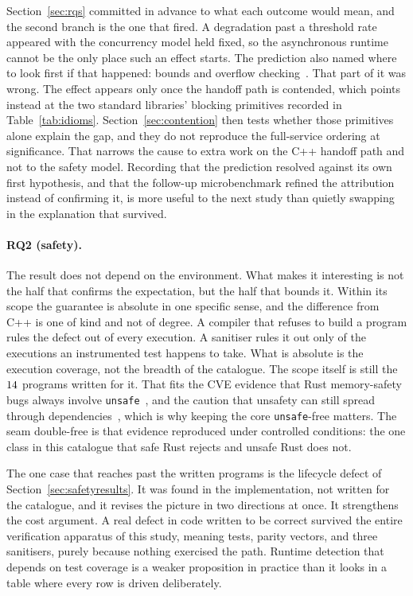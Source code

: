 \documentclass[english,oneside,a4paper,censored,csm,software-track-2020]{HYthesisML}
\begin{document}
Section~\ref{sec:rqs}
committed in advance to what each outcome would mean, and the second branch is the one that
fired. A degradation past a threshold rate appeared with the concurrency model held fixed, so the
asynchronous runtime cannot be the only place such an effect starts. The prediction also
named where to look first if that happened: bounds and overflow
checking~\cite{zhang2022runtime,harris2023morello}. That part of it was wrong. The effect
appears only once the handoff path is contended, which points instead at the two standard
libraries' blocking primitives recorded in Table~\ref{tab:idioms}. Section~\ref{sec:contention}
then tests whether those primitives alone explain the gap, and they do not reproduce the
full-service ordering at significance. That narrows the cause to extra work on the C++ handoff
path and not to the safety model. Recording that the prediction resolved against its own first
hypothesis, and that the follow-up microbenchmark refined the attribution instead of confirming it,
is more useful to the next study than quietly swapping in the explanation that survived.

\paragraph{RQ2 (safety).} The result does not depend on the environment. What makes it
interesting is not the half that confirms the expectation, but the half that bounds it. Within
its scope the guarantee is absolute in one specific sense, and the difference from C++ is one of
kind and not of degree. A compiler that refuses to build a program rules the defect out of
every execution. A sanitiser rules it out only of the executions an instrumented test
happens to take. What is absolute is the execution coverage, not the breadth of the catalogue.
The scope itself is still the $14$ programs written for it.
That fits the CVE evidence that Rust memory-safety bugs always involve
\texttt{unsafe}~\cite{xu2021rustcve}, and the caution that unsafety can still spread
through dependencies~\cite{evans2020rust}, which is why keeping the core \texttt{unsafe}-free
matters. The seam double-free is that evidence reproduced under controlled conditions: the one
class in this catalogue that safe Rust rejects and unsafe Rust does not.

The one case that reaches past the written programs is the lifecycle defect of
Section~\ref{sec:safetyresults}. It was found in the implementation, not written for
the catalogue, and it revises the picture in two directions at once. It strengthens the cost
argument. A real defect in code written to be correct survived the entire verification
apparatus of this study, meaning tests, parity vectors, and three sanitisers, purely because
nothing exercised the path. Runtime detection that depends on test coverage is a weaker
proposition in practice than it looks in a table where every row is driven deliberately.
\end{document}
